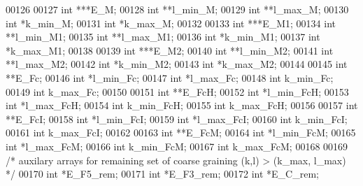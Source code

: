 \begin{DoxyCode}
00126 
00127       \textcolor{keywordtype}{int}             ***E\_M;
00128       \textcolor{keywordtype}{int}             **l\_min\_M;
00129       \textcolor{keywordtype}{int}             **l\_max\_M;
00130       \textcolor{keywordtype}{int}             *k\_min\_M;
00131       \textcolor{keywordtype}{int}             *k\_max\_M;
00132 
00133       \textcolor{keywordtype}{int}             ***E\_M1;
00134       \textcolor{keywordtype}{int}             **l\_min\_M1;
00135       \textcolor{keywordtype}{int}             **l\_max\_M1;
00136       \textcolor{keywordtype}{int}             *k\_min\_M1;
00137       \textcolor{keywordtype}{int}             *k\_max\_M1;
00138 
00139       \textcolor{keywordtype}{int}             ***E\_M2;
00140       \textcolor{keywordtype}{int}             **l\_min\_M2;
00141       \textcolor{keywordtype}{int}             **l\_max\_M2;
00142       \textcolor{keywordtype}{int}             *k\_min\_M2;
00143       \textcolor{keywordtype}{int}             *k\_max\_M2;
00144 
00145       \textcolor{keywordtype}{int}             **E\_Fc;
00146       \textcolor{keywordtype}{int}             *l\_min\_Fc;
00147       \textcolor{keywordtype}{int}             *l\_max\_Fc;
00148       \textcolor{keywordtype}{int}             k\_min\_Fc;
00149       \textcolor{keywordtype}{int}             k\_max\_Fc;
00150 
00151       \textcolor{keywordtype}{int}             **E\_FcH;
00152       \textcolor{keywordtype}{int}             *l\_min\_FcH;
00153       \textcolor{keywordtype}{int}             *l\_max\_FcH;
00154       \textcolor{keywordtype}{int}             k\_min\_FcH;
00155       \textcolor{keywordtype}{int}             k\_max\_FcH;
00156 
00157       \textcolor{keywordtype}{int}             **E\_FcI;
00158       \textcolor{keywordtype}{int}             *l\_min\_FcI;
00159       \textcolor{keywordtype}{int}             *l\_max\_FcI;
00160       \textcolor{keywordtype}{int}             k\_min\_FcI;
00161       \textcolor{keywordtype}{int}             k\_max\_FcI;
00162 
00163       \textcolor{keywordtype}{int}             **E\_FcM;
00164       \textcolor{keywordtype}{int}             *l\_min\_FcM;
00165       \textcolor{keywordtype}{int}             *l\_max\_FcM;
00166       \textcolor{keywordtype}{int}             k\_min\_FcM;
00167       \textcolor{keywordtype}{int}             k\_max\_FcM;
00168 
00169       \textcolor{comment}{/* auxilary arrays for remaining set of coarse graining (k,l) > (k\_max, l\_max) */}
00170       \textcolor{keywordtype}{int}             *E\_F5\_rem;
00171       \textcolor{keywordtype}{int}             *E\_F3\_rem;
00172       \textcolor{keywordtype}{int}             *E\_C\_rem;

\end{DoxyCode}
